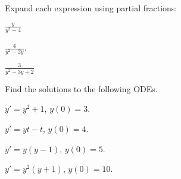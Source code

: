   \begin{problem}
  \item Expand each expression using partial fractions:
    \begin{subproblem}
    \item $\frac{y}{y^2-4}$
      \vfill

    \item $\frac{4}{y^2-2y}$.
      \vfill
      
    \item $\frac{3}{y^2-3y+2}$
      \vfill

    \end{subproblem}
    \clearpage
  \item Find the solutions to the following ODEs. 
    \begin{subproblem}
    \item $y' = y^2 + 1$, $y(0)=3$.
      \vfill
    \item $y' = yt - t$, $y(0)=4$.
      \vfill
    \item $y'=y(y-1)$, $y(0)=5$.
      \vfill
    \item $y' = y^2(y+1)$, $y(0)=10$.
      \vfill
    \end{subproblem}

  \end{problem}


